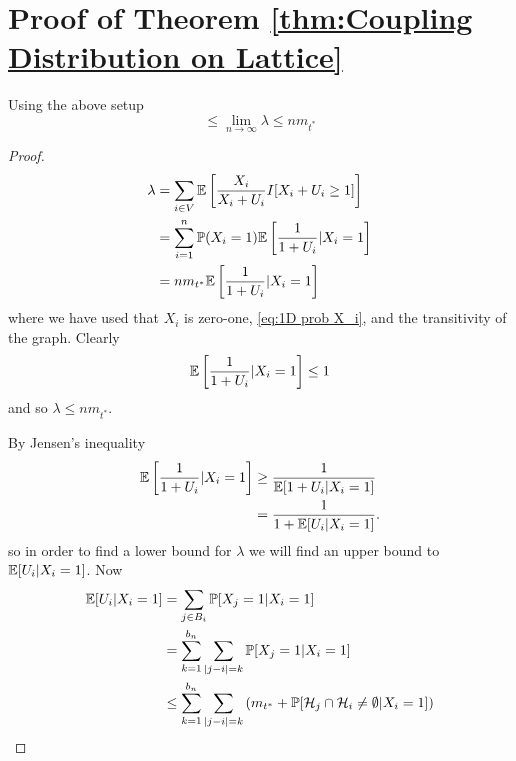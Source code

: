 \section{Proof of Theorem \ref{thm:Coupling Distribution on Lattice}}
\begin{lemma}
\label{lem:nDlambda}
	Using the above setup
	\begin{equation}
		 \leq \lim_{n \rightarrow \infty} \lambda \leq n m_{t^*}
	\end{equation}
\end{lemma}
\begin{proof}
	\begin{align}
		\lambda &= \sum_{i \in V} \mathbb{E}\left[\frac{X_i}{X_i + U_i} I[ X_i + U_i \geq 1] \right]\\
			&= \sum_{i = 1}^n \mathbb{P}(X_i = 1) \mathbb{E} \left[\frac{1}{1 + U_i}| X_i = 1\right]\\
			&= n m_{t^*} \mathbb{E} \left[\frac{1}{1 + U_i}| X_i = 1\right]
	\end{align}
	where we have used that $X_i$ is zero-one, \eqref{eq:1D prob X_i}, and the transitivity of the graph.
	Clearly 
	\begin{align}
		\mathbb{E} \left[\frac{1}{1 + U_i}| X_i = 1\right] \leq 1
	\end{align}
	and so $\lambda \leq n m_{t^*}$.

	By Jensen's inequality
	\begin{align}
		\mathbb{E} \left[\frac{1}{1 + U_i}| X_i = 1\right] &\geq \frac{1}{\mathbb{E}[1 + U_i | X_i = 1]}\\
			&= \frac{1}{1 + \mathbb{E}[U_i | X_i = 1]}.
	\end{align}
	so in order to find a lower bound for $\lambda$ we will find an upper bound to $\mathbb{E}[U_i | X_i = 1]$. Now
	\begin{align}
		\mathbb{E}[U_i | X_i = 1] &= \sum_{j \in B_i} \mathbb{P}[X_j = 1| X_i = 1]\\
			&= \sum_{k=1}^{b_n} \sum_{|j - i| = k} \mathbb{P}[X_j = 1| X_i = 1]\\
			& \leq \sum_{k=1}^{b_n} \sum_{|j - i| = k} \left(m_{t^*} + \mathbb{P}[\mathcal{H}_{j} \cap \mathcal{H}_i \neq \emptyset | X_i = 1] \right)
	\end{align}
\end{proof}

